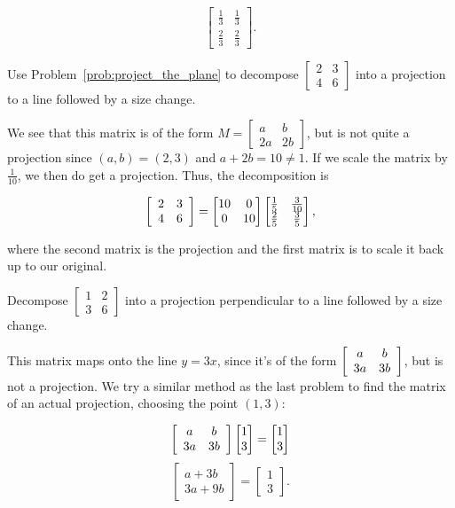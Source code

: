 \documentclass[../key.tex]{subfiles}
\begin{document}
$$\begin{bmatrix}
\frac{1}{3} & \frac{1}{3} \\
\frac{2}{3} & \frac{2}{3}
\end{bmatrix}.$$

\begin{outer_problem}
\item Use Problem~\ref{prob:project_the_plane} to decompose $\left[\begin{smallmatrix} 2 & 3 \\ 4 & 6 \end{smallmatrix}\right]$ into a projection to a line followed by a size change.
\end{outer_problem}

We see that this matrix is of the form $M=\left[\begin{smallmatrix} a & b \\ 2a & 2b\end{smallmatrix}\right]$, but is not quite a projection since $(a,b)=(2,3)$ and $a+2b=10\neq 1$. If we scale the matrix by $\frac{1}{10}$, we then do get a projection. Thus, the decomposition is

    $$\left[\begin{array}{cc} 2 & 3 \\ 4 & 6 \end{array}\right] = \begin{bmatrix}10 & 0 \\ 0 & 10 \end{bmatrix} \begin{bmatrix}
    \frac{1}{5} & \frac{3}{10} \\
    \frac{2}{5} & \frac{3}{5}
\end{bmatrix},$$

where the second matrix is the projection and the first matrix is to scale it back up to our original.

\begin{outer_problem}
\item Decompose $\left[\begin{smallmatrix} 1 & 2 \\ 3 & 6\end{smallmatrix}\right]$ into a projection perpendicular to a line followed by a size change.
\end{outer_problem}

This matrix maps onto the line $y=3x$, since it's of the form $\left[\begin{array}{cc} a & b \\ 3a & 3b \end{array}\right]$, but is not a projection. We try a similar method as the last problem to find the matrix of an actual projection, choosing the point $(1,3)$:

$$\left[\begin{array}{cc} a & b \\ 3a & 3b \end{array}\right]\begin{bmatrix} 1 \\ 3 \end{bmatrix} = \begin{bmatrix} 1 \\ 3 \end{bmatrix}$$
$$\begin{bmatrix} a + 3b \\ 3a + 9b \end{bmatrix} = \begin{bmatrix} 1 \\ 3 \end{bmatrix}.$$
\end{document}
